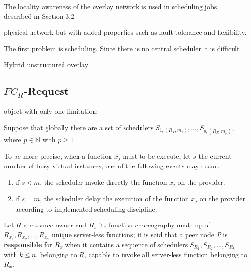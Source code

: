 \documentclass[10pt,a4paper]{article}
\theoremstyle{definition}
\begin{document}
The locality awareness of the overlay network is used in scheduling jobs, described in Section 3.2







physical network but with added properties such as fault tolerance and flexibility. 











The first problem is scheduling. Since there
is no central scheduler it is difficult



Hybrid unstructured overlay


\subsection{$FC_R$-Request}







 object with only one limitation:

Suppose that globally there are a set of schedulers $S_{1,({R_{X}},m_1)}, \ldots , S_{p,({R_{X}},m_p)}$, where $p \in \mathbb{N}$ with $p \geq 1$



To be more precise, when a function $x_j$ must to be execute, let $s$ the current number of busy virtual instances, one of the following events may occur:
\begin{enumerate}
\item if $s < m$, the scheduler invoke directly the function $x_j$ on the provider.
\item if $s = m$, the scheduler delay the execution of the function $x_j$ on the provider according to implemented scheduling discipline.
\end{enumerate}








Let $R$ a resource owner and $R_x$ its function choreography made up of $R_{x_1}, R_{x_2}, \ldots, R_{x_n}$ unique server-less functions; it is said that a peer node $P$ is \textbf{responsible} for $R_x$ when it contains a sequence of schedulers $S_{R_1}, S_{R_2}, \ldots, S_{R_k}$ with $k \leq n$, belonging to $R$, capable to invoke all server-less function belonging to $R_x$. 
\end{document}
